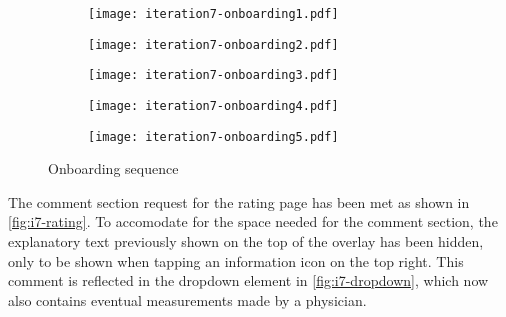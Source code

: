 \begin{figure}
    \centering
    \captionsetup[subfigure]{justification=centering}
    \begin{subfigure}[t]{0.19\textwidth}
        \centering
        \vspace{0pt}
        \texttt{[image: iteration7-onboarding1.pdf]}
        \label{fig:i7-onboarding-1}
    \end{subfigure}
    \begin{subfigure}[t]{0.19\textwidth}
        \centering
        \vspace{0pt}
        \texttt{[image: iteration7-onboarding2.pdf]}
        \label{fig:i7-onboarding-2}
    \end{subfigure}
    \begin{subfigure}[t]{0.19\textwidth}
        \centering
        \vspace{0pt}
        \texttt{[image: iteration7-onboarding3.pdf]}
        \label{fig:i7-onboarding-3}
    \end{subfigure}
    \begin{subfigure}[t]{0.19\textwidth}
        \centering
        \vspace{0pt}
        \texttt{[image: iteration7-onboarding4.pdf]}
        \label{fig:i7-onboarding-4}
    \end{subfigure}
    \begin{subfigure}[t]{0.19\textwidth}
        \centering
        \vspace{0pt}
        \texttt{[image: iteration7-onboarding5.pdf]}
        \label{fig:i7-onboarding-5}
    \end{subfigure}
    \caption{Onboarding sequence}
    \label{fig:i7-onboarding}
\end{figure}

The comment section request for the rating page has been met as shown in \autoref{fig:i7-rating}. To accomodate for the space needed for the comment section, the explanatory text previously shown on the top of the overlay has been hidden, only to be shown when tapping an information icon on the top right. This comment is reflected in the dropdown element in \autoref{fig:i7-dropdown}, which now also contains eventual measurements made by a physician.

